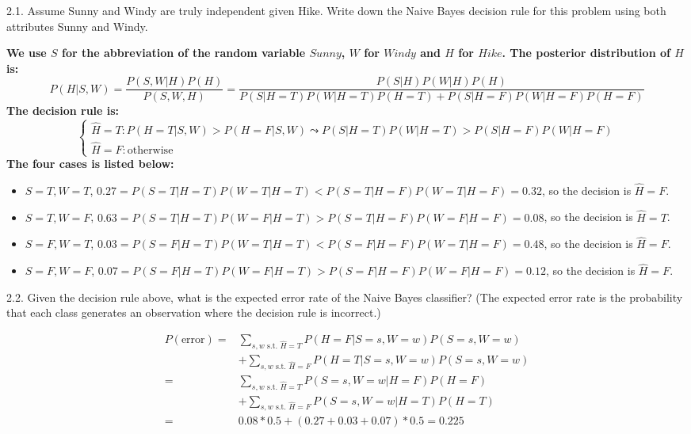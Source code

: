 \documentclass{article}
\theoremstyle{definition}
\theoremstyle{definition}
\theoremstyle{remark}
\begin{document}
2.1. Assume Sunny and Windy are truly independent given Hike. Write down the Naive Bayes
decision rule for this problem using both attributes Sunny and Windy.
\begin{addmargin}[3em]{2em}
  \textbf{We use $S$ for the abbreviation of the random variable $Sunny$, $W$ for $Windy$ and $H$ for $Hike$. The posterior distribution of $H$ is:}
  \[
  P(H | S, W) = \frac{P(S, W | H)P(H)}{P(S, W, H)} = \frac{P(S | H)P(W | H)P(H)}{P(S|H=T)P(W | H = T)P(H=T) + P(S|H=F)P(W | H = F)P(H=F)}
  \]
  \textbf{The decision rule is:}
  \[
  \begin{cases}
    \hat{H}=T: P(H=T|S,W) > P(H=F|S,W) \leadsto P(S|H=T)P(W|H=T) > P(S|H=F)P(W|H=F)\\
    \hat{H}=F: \mbox{otherwise}
  \end{cases}
  \]
  \textbf{The four cases is listed below:}
  \begin{itemize}
  \item $S=T, W=T$, $0.27 = P(S=T|H=T)P(W=T|H=T) < P(S=T|H=F)P(W=T|H=F) = 0.32$, so the decision is $\hat{H} = F$.
  \item $S=T, W=F$, $0.63 = P(S=T|H=T)P(W=F|H=T) > P(S=T|H=F)P(W=F|H=F) = 0.08$, so the decision is $\hat{H} = T$.
  \item $S=F, W=T$, $0.03 = P(S=F|H=T)P(W=T|H=T) < P(S=F|H=F)P(W=T|H=F) = 0.48$, so the decision is $\hat{H} = F$.
  \item $S=F, W=F$, $0.07 = P(S=F|H=T)P(W=F|H=T) > P(S=F|H=F)P(W=F|H=F) = 0.12$, so the decision is $\hat{H} = F$.
  \end{itemize}
\end{addmargin}

2.2. Given the decision rule above, what is the expected error rate of the Naive Bayes classifier? (The
expected error rate is the probability that each class generates an observation where the decision
rule is incorrect.)
\begin{addmargin}[3em]{2em}
  \[
  \begin{split}
    P(\mbox{error}) = & \sum_{s, w \mbox{ s.t. } \hat{H}=T}P(H=F|S=s,W=w)P(S=s, W=w)\\
    & + \sum_{s, w \mbox{ s.t. } \hat{H} = F}P(H=T|S=s, W=w)P(S=s, W=w) \\
    = & \sum_{s, w \mbox{ s.t. } \hat{H}=T}P(S=s,W=w|H=F)P(H=F)\\
    & + \sum_{s, w \mbox{ s.t. } \hat{H}=F}P(S=s,W=w|H=T)P(H=T) \\
    = & 0.08 * 0.5 + (0.27 + 0.03 + 0.07) * 0.5 = 0.225
  \end{split}
  \]
\end{addmargin}
\end{document}
